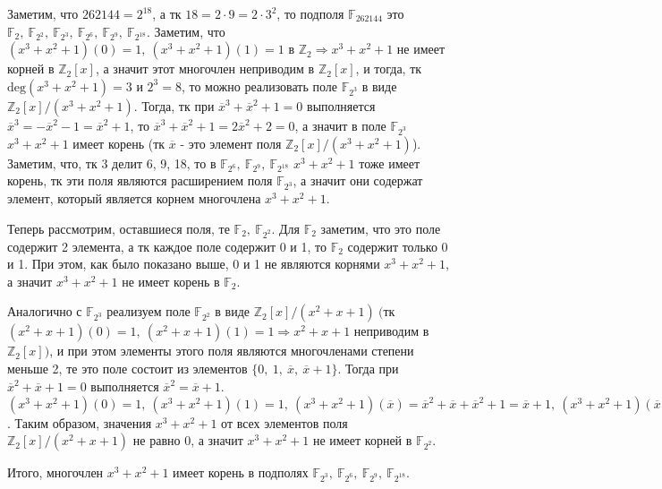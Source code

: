 \documentclass[a4paper, 16pt]{article}
\newcommand{\Z} {\mathbb{Z}}
\newenvironment{solution}[1][Решение]{%
	\begin{trivlist}
		\item[\hskip \labelsep {\bfseries #1:}]
		\item \hspace{15pt}
	}{
	\end{trivlist}
}
\begin{document}
		\begin{solution}
			Заметим, что $262144 = 2^{18}$, а тк $18 = 2 \cdot 9 = 2 \cdot 3^2$, то подполя $\mathbb{F}_{262144}$ это $\mathbb{F}_2, \ 
			\mathbb{F}_{2^2}, \ \mathbb{F}_{2^3}, \ \mathbb{F}_{2^6}, \ \mathbb{F}_{2^9}, \ \mathbb{F}_{2^{18}}$. Заметим, что $(x^3 + x^2 + 1)(0) = 1, \ (x^3 + x^2 + 1)(1) = 1$ в $\Z_2 \Rightarrow x^3 + x^2 + 1$ не имеет корней в $\Z_2[x]$, а значит этот многочлен неприводим в $\Z_2[x]$, и тогда, тк $\text{deg}(x^3 + x^2 + 1) = 3$ и $2^3 = 8$, то можно реализовать поле $\mathbb{F}_{2^3}$ в виде $\Z_2[x] / (x^3 + x^2 + 1)$. Тогда, тк при $\overline{x}^3 + \overline{x}^2 + 1 = 0$ выполняется $\overline{x}^3 = - \overline{x}^2 - 1 =  \overline{x}^2 + 1$, то $\overline{x}^3 + \overline{x}^2 + 1 = 2\overline{x}^2 + 2 = 0$, а значит в поле $\mathbb{F}_{2^3}$ $x^3 + x^2 + 1$ имеет корень (тк $\overline{x}$ - это элемент поля $\Z_2[x] / (x^3 + x^2 + 1)$). Заметим, что, тк 3 делит 6, 9, 18, то в $\mathbb{F}_{2^6}, \ \mathbb{F}_{2^9}, \ \mathbb{F}_{2^{18}}$ $x^3 + x^2 + 1$ тоже имеет корень, тк эти поля являются расширением поля $\mathbb{F}_{2^3}$, а значит они содержат элемент, который является корнем многочлена $x^3 + x^2 + 1$. 
			
			Теперь рассмотрим, оставшиеся поля, те $\mathbb{F}_2, \ 
			\mathbb{F}_{2^2}$.
			Для $\mathbb{F}_2$ заметим, что это поле содержит 2 элемента, а тк каждое поле содержит 0 и 1, то $\mathbb{F}_2$ содержит только 0 и 1. При этом, как было показано выше, 0 и 1 не являются корнями $x^3 + x^2 + 1$, а значит $x^3 + x^2 + 1$ не имеет корень в $\mathbb{F}_2$. 
			
			Аналогично с $\mathbb{F}_{2^3}$ реализуем  поле $\mathbb{F}_{2^2}$ в виде $\Z_2[x] / (x^2 + x + 1) \ ($тк $(x^2 + x + 1)(0) = 1, \ (x^2 + x + 1)(1) = 1 \Rightarrow x^2 + x + 1$ неприводим в $\Z_2[x])$, и при этом элементы этого поля являются многочленами степени меньше 2, те это поле состоит из элементов $\{0, \ 1, \ \overline{x}, \ \overline{x} + 1\}$. Тогда при 
			$\overline{x}^2 + \overline{x} + 1 = 0$ выполняется $\overline{x}^2 = \overline{x} + 1$. 
			$(x^3 + x^2 + 1)(0) = 1, \ (x^3 + x^2 + 1)(1) = 1, \ (x^3 + x^2 + 1)(\overline{x}) = \overline{x}^2 + \overline{x} + \overline{x}^2 + 1 = 
			\overline{x} + 1, \ 
			(x^3 + x^2 + 1)(\overline{x} + 1) = (\overline{x} + 1)^3 + (\overline{x} + 1)^2 + 1 = (\overline{x} + 1)(\overline{x}^2 + 1) + (\overline{x}^2 + 1) + 1 =
			(\overline{x} + 1)\overline{x} + \overline{x} + 1 = 
			\overline{x} + 1 + \overline{x} + \overline{x} + 1 = \overline{x}$.
			Таким образом, значения $x^3 + x^2 + 1$ от всех элементов поля $\Z_2[x] / (x^2 + x + 1)$ не равно 0, а значит $x^3 + x^2 + 1$ не имеет корней в $\mathbb{F}_{2^2}$.
			
			Итого, многочлен $x^3 + x^2 + 1$ имеет корень в подполях 
			$ \mathbb{F}_{2^3}, \ \mathbb{F}_{2^6}, \ \mathbb{F}_{2^9}, \ \mathbb{F}_{2^{18}}$.
		\end{solution}
	
\end{document}
